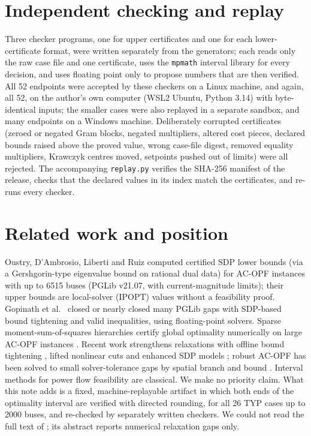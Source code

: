 \documentclass[10pt]{article}
\begin{document}
\section{Independent checking and replay}
Three checker programs, one for upper certificates and one for each lower-certificate format, were written separately from
the generators; each reads only the raw case file and one certificate, uses the \texttt{mpmath} interval library for every
decision, and uses floating point only to propose numbers that are then verified. All 52 endpoints were accepted by these
checkers on a Linux machine, and again, all 52, on the author's own computer (WSL2 Ubuntu, Python 3.14) with byte-identical inputs;
the smaller cases were also replayed in a separate sandbox, and many endpoints on a Windows machine. Deliberately corrupted
certificates (zeroed or negated Gram blocks, negated multipliers, altered cost pieces, declared bounds raised above the
proved value, wrong case-file digest, removed equality multipliers, Krawczyk centres moved, setpoints pushed out of
limits) were all rejected. The accompanying \texttt{replay.py} verifies the SHA-256 manifest of the release, checks that the
declared values in its index match the certificates, and re-runs every checker.

\section{Related work and position}
Oustry, D'Ambrosio, Liberti and Ruiz \cite{oustry} computed certified SDP lower bounds (via a Gershgorin-type eigenvalue
bound on rational dual data) for AC-OPF instances with up to 6515 buses (PGLib v21.07, with current-magnitude limits);
their upper bounds are local-solver (IPOPT) values without a feasibility proof. Gopinath et al.\ \cite{gopinath} closed or nearly closed many PGLib gaps with SDP-based bound
tightening and valid inequalities, using floating-point solvers. Sparse moment-sum-of-squares hierarchies certify global
optimality numerically on large AC-OPF instances \cite{cstssos,wangopf,lefranc}. Recent work strengthens relaxations with
offline bound tightening \cite{an}, lifted nonlinear cuts \cite{bugosen} and enhanced SDP models \cite{enhancedsdp}; robust
AC-OPF has been solved to small solver-tolerance gaps by spatial branch and bound \cite{yin}. Interval methods for power
flow feasibility are classical. We make no priority claim. What this note adds is a fixed, machine-replayable artifact in
which both ends of the optimality interval are verified with directed rounding, for all 26 TYP cases up to 2000 buses, and
re-checked by separately written checkers. We could not read the full text of \cite{an}; its abstract reports
numerical relaxation gaps only.
\end{document}
